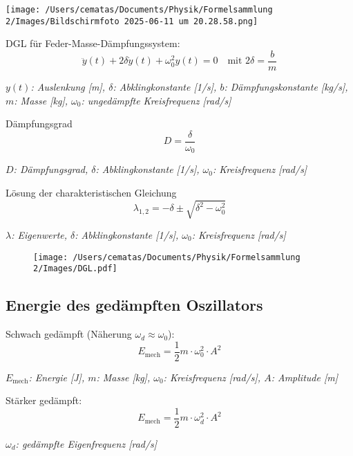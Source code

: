 \documentclass[a4paper,10pt]{article}
\newenvironment{displayformula}
{
	\begin{framed}
		\color{formulaColor}
	}
	{\end{framed}}
\newcommand{\formulalegend}[1]{%
	\par\vspace{0.5ex}%
	{{\color{legendColor}\RaggedRight\small\textit{#1}}}%
	\par\vspace{1.5ex}%
}
\begin{document}
\texttt{[image: /Users/cematas/Documents/Physik/Formelsammlung 2/Images/Bildschirmfoto 2025-06-11 um 20.28.58.png]}

\begin{displayformula}
	DGL für Feder-Masse-Dämpfungssystem:
	\[
	\ddot{y}(t) + 2\delta \dot{y}(t) + \omega_0^2 y(t) = 0
	\quad \text{mit } 2\delta = \frac{b}{m}
	\]
\end{displayformula}
\formulalegend{
	\( y(t) \): Auslenkung [m], \( \delta \): Abklingkonstante [1/s], \( b \): Dämpfungskonstante [kg/s], \( m \): Masse [kg], \( \omega_0 \): ungedämpfte Kreisfrequenz [rad/s]
}

\begin{displayformula}
	Dämpfungsgrad
	\[
	D = \frac{\delta}{\omega_0}
	\]
\end{displayformula}
\formulalegend{
	\( D \): Dämpfungsgrad, \( \delta \): Abklingkonstante [1/s], \( \omega_0 \): Kreisfrequenz [rad/s]
}

\begin{displayformula}
	Lösung der charakteristischen Gleichung
	\[
	\lambda_{1,2} = -\delta \pm \sqrt{\delta^2 - \omega_0^2}
	\]
\end{displayformula}
\formulalegend{
	\( \lambda \): Eigenwerte, \( \delta \): Abklingkonstante [1/s], \( \omega_0 \): Kreisfrequenz [rad/s]
}

\begin{figure}[h!]
	\centering
	\texttt{[image: /Users/cematas/Documents/Physik/Formelsammlung 2/Images/DGL.pdf]}
\end{figure}

\subsection{Energie des gedämpften Oszillators}

\begin{displayformula}
	Schwach gedämpft (Näherung \( \omega_d \approx \omega_0 \)):
	\[
	E_{\text{mech}} = \frac{1}{2} m \cdot \omega_0^2 \cdot A^2
	\]
\end{displayformula}
\formulalegend{
	\( E_{\text{mech}} \): Energie [J], \( m \): Masse [kg], \( \omega_0 \): Kreisfrequenz [rad/s], \( A \): Amplitude [m]
}

\begin{displayformula}
	Stärker gedämpft:
	\[
	E_{\text{mech}} = \frac{1}{2} m \cdot \omega_d^2 \cdot A^2
	\]
\end{displayformula}
\formulalegend{
	\( \omega_d \): gedämpfte Eigenfrequenz [rad/s]
}
\end{document}
